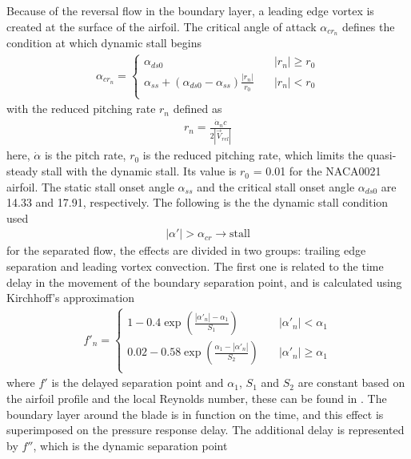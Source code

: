 \documentclass[a4paper]{jpconf}
\begin{document}
Because of the reversal flow in the boundary layer, a leading edge vortex is created at the surface of the airfoil. The critical angle of attack $\alpha_{cr_n}$ defines the condition at which dynamic stall begins
\begin{align}
\alpha_{cr_n} =
\begin{cases}
    \alpha_{ds0}       & \quad |r_n| \geqslant r_0 \\
    \alpha_{ss} + (\alpha_{ds0} - \alpha_{ss}) \frac{| r_n |}{r_0}       & \quad |r_n| < r_0 \\
\end{cases}		\label{criticalpha}
\end{align}
with the reduced pitching rate $r_n$ defined as
\begin{align}
r_n = \frac{\dot{\alpha}_n c}{ 2 | \vec{V}_{rel} | }
\end{align}
here, $\dot{\alpha}$ is the pitch rate, $r_0$ is the reduced pitching rate, which limits the quasi-steady stall with the dynamic stall. Its value is $r_0$ = 0.01 for the NACA0021 airfoil. The static stall onset angle $\alpha_{ss}$ and the critical stall onset angle $\alpha_{ds0}$ are 14.33 and 17.91, respectively. The following is the the dynamic stall condition used
\begin{align}
| \alpha ' | > \alpha_{cr} \rightarrow \mathrm{stall} \label{stall}
\end{align}
for the separated flow, the effects are divided in two groups: trailing edge separation and leading vortex convection. The first one is related to the time delay in the movement of the boundary separation point, and is calculated using Kirchhoff's approximation
\begin{align}
f'_n =
\begin{cases}
    1- 0.4 \exp \left( \frac{|\alpha'_n| - \alpha_1 }{S_1}   \right)    & \quad |\alpha'_n| <  \alpha_1 \\
    0.02- 0.58 \exp \left( \frac{\alpha_1 - |\alpha'_n| }{S_2} \right)  & \quad |\alpha'_n| \geqslant  \alpha_1 \\
\end{cases}		\label{criticalpha2}
\end{align}
where $f'$ is the delayed separation point and $\alpha_1$, $S_1$ and $S_2$ are constant based on the airfoil profile and the local Reynolds number, these can be found in \cite{dyachuk2013dynamic}. The boundary layer around the blade is in function on the time, and this effect is superimposed on the pressure response delay. The additional delay is represented by $f''$, which is the dynamic separation point
\end{document}
